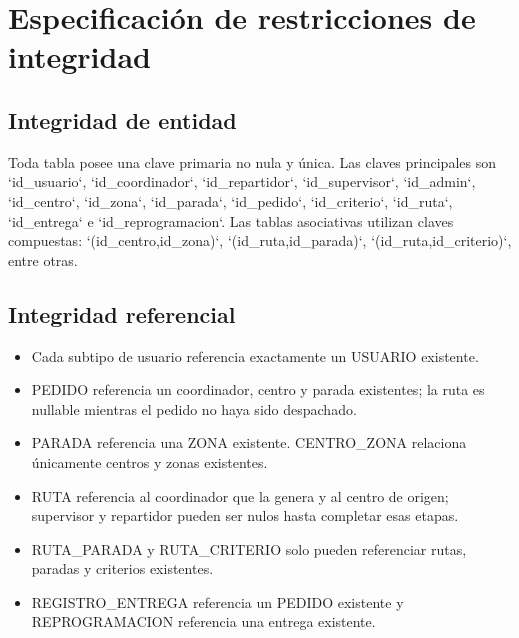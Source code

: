 \documentclass[12pt,a4paper]{article}
\begin{document}
\section{Especificación de restricciones de integridad}

\subsection{Integridad de entidad}
Toda tabla posee una clave primaria no nula y única. Las claves principales son `id\_usuario`, `id\_coordinador`, `id\_repartidor`, `id\_supervisor`, `id\_admin`, `id\_centro`, `id\_zona`, `id\_parada`, `id\_pedido`, `id\_criterio`, `id\_ruta`, `id\_entrega` e `id\_reprogramacion`. Las tablas asociativas utilizan claves compuestas: `(id\_centro,id\_zona)`, `(id\_ruta,id\_parada)`, `(id\_ruta,id\_criterio)`, entre otras.

\subsection{Integridad referencial}
\begin{itemize}
\item Cada subtipo de usuario referencia exactamente un USUARIO existente.
\item PEDIDO referencia un coordinador, centro y parada existentes; la ruta es nullable mientras el pedido no haya sido despachado.
\item PARADA referencia una ZONA existente. CENTRO\_ZONA relaciona únicamente centros y zonas existentes.
\item RUTA referencia al coordinador que la genera y al centro de origen; supervisor y repartidor pueden ser nulos hasta completar esas etapas.
\item RUTA\_PARADA y RUTA\_CRITERIO solo pueden referenciar rutas, paradas y criterios existentes.
\item REGISTRO\_ENTREGA referencia un PEDIDO existente y REPROGRAMACION referencia una entrega existente.
\end{itemize}
\end{document}
